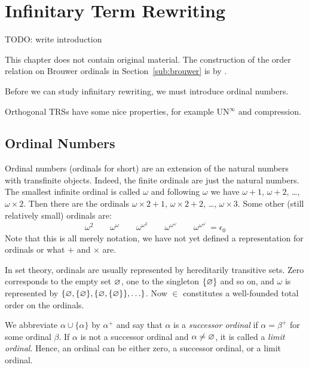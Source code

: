 \chapter{Infinitary Term Rewriting}\label{chap:rewriting}

TODO: write introduction

This chapter does not contain original material. The construction of the
order relation on Brouwer ordinals in Section~\ref{sub:brouwer} is by
\citet{hancock-08}.

Before we can study infinitary rewriting, we must introduce ordinal numbers.

Orthogonal TRSs have some nice properties, for example UN$^{\infty}$ and
compression.



\section{Ordinal Numbers}


Ordinal numbers (ordinals for short) \citep{cantor-15}
are an extension of the natural numbers
with transfinite objects. Indeed, the finite ordinals are just the natural
numbers. The smallest infinite ordinal is called $\omega$ and following
$\omega$ we have $\omega + 1$, $\omega + 2$, \ldots, $\omega \times 2$. Then
there are the ordinals $\omega \times 2 + 1$, $\omega \times 2 + 2$, \ldots,
$\omega \times 3$. Some other (still relatively small) ordinals are:
\begin{displaymath}
  \omega^2 \qquad
  \omega^\omega \qquad
  \omega^{\omega^2} \qquad
  \omega^{\omega^\omega} \qquad
  \omega^{\omega^{\omega^{\iddots}}} = \epsilon_0
\end{displaymath}
Note that this is all merely notation, we have not yet defined a
representation for ordinals or what $+$ and $\times$ are.

In set theory, ordinals are usually represented by hereditarily transitive
sets. Zero corresponds to the empty set $\varnothing$, one to the
singleton $\{ \varnothing \}$ and so on, and $\omega$ is represented by
$\{ \varnothing, \{ \varnothing \}, \{ \varnothing, \{ \varnothing \} \} , \ldots
\}$. Now $\in$ constitutes a well-founded total order on the
ordinals.

We abbreviate $\alpha \cup \{ \alpha \}$ by $\alpha^+$ and say that
$\alpha$ is a \emph{successor ordinal} if $\alpha = \beta^+$ for some
ordinal $\beta$. If $\alpha$ is not a successor ordinal and $\alpha
\neq \varnothing$, it is called a \emph{limit ordinal}. Hence, an ordinal
can be either zero, a successor ordinal, or a limit ordinal.

